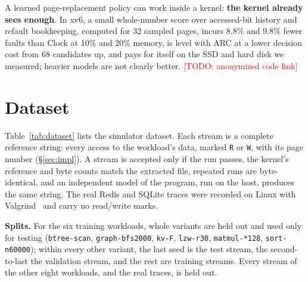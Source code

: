 \documentclass{article}
\newcommand{\clock}{Clock\xspace}
\newcommand{\todo}[1]{\textcolor{red}{[TODO: #1]}}
\newcommand{\finding}[1]{\textbf{#1}\hspace{0.4em}}
\newif\ifwithappendix
\begin{document}
A learned page-replacement policy can work inside a kernel: \textbf{the kernel already
sees enough}. In xv6, a small whole-number score over accessed-bit history and refault
bookkeeping, computed for 32 sampled pages, incurs 8.8\% and 9.8\% fewer faults than
\clock at 10\% and 20\% memory, is level with ARC at a lower decision cost from 68
candidates up, and pays for
itself on the SSD and hard disk we measured; heavier models are not clearly better.
\todo{anonymized code link}





\ifwithappendix
\clearpage
\appendix

\section{Dataset}
\label{app:data}

Table~\ref{tab:dataset} lists the simulator dataset. Each stream is a complete reference
string: every access to the workload's data, marked \texttt{R} or \texttt{W}, with its
page number (\S\ref{sec:impl}). A stream is accepted only if the run passes, the
kernel's reference and byte counts match the extracted file, repeated runs are
byte-identical, and an independent model of the program, run on the host, produces the
same string. The real Redis and SQLite traces were recorded on Linux with
Valgrind~\citep{nethercote2007valgrind} and carry no read/write marks.

\finding{Splits.} For the six training workloads, whole variants are held out and used
only for testing (\texttt{btree-scan}, \texttt{graph-bfs2000}, \texttt{kv-F},
\texttt{lzw-r30}, \texttt{matmul-*128}, \texttt{sort-n60000}); within every other
variant, the last seed is the test stream, the second-to-last the validation stream,
and the rest are training streams. Every stream of the other eight workloads, and the
real traces, is held out.
\end{document}
